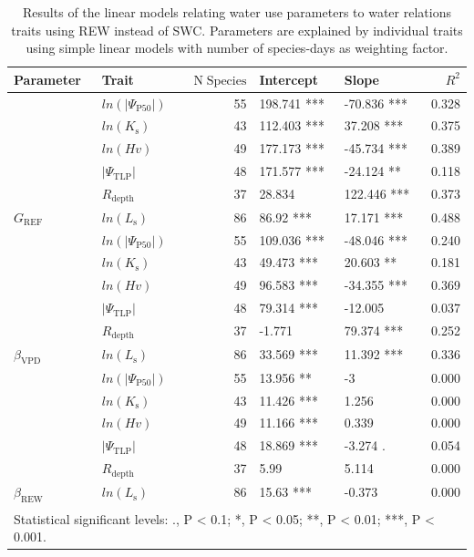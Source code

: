 \documentclass[11pt,twoside]{reedthesis}
\begin{document}
\newpage
\begin{table}[H]

\caption[Results of the linear models relating water use parameters to water relations traits using REW instead of SWC.]{\label{tab:tablaresultados}Results of the linear models relating water use parameters to water relations traits using REW instead of SWC. Parameters are explained by individual traits using simple linear models with number of species-days as weighting factor.}
\centering
\fontsize{12}{14}\selectfont
\begin{tabular}[t]{llrllr}
\toprule
Parameter & Trait & $\text{N}\;\text{Species}$ & Intercept & Slope & $R^2$\\
\midrule
 & $ln(\rvert\Psi_{\text{P50}}\rvert)$ & 55 & 198.741 *** & -70.836 *** & 0.328\\
\cmidrule{2-6}
 & $ln(K_{\text{s}})$ & 43 & 112.403 *** & 37.208 *** & 0.375\\
\cmidrule{2-6}
 & $ln(Hv)$ & 49 & 177.173 *** & -45.734 *** & 0.389\\
\cmidrule{2-6}
 & $\rvert\Psi_{\text{TLP}}\rvert$ & 48 & 171.577 *** & -24.124 ** & 0.118\\
\cmidrule{2-6}
 & $R_{\text{depth}}$ & 37 & 28.834 & 122.446 *** & 0.373\\
\cmidrule{2-6}
\multirow{-6}{*}{\raggedright\arraybackslash $G_{\text{REF}}$} & $ln(L_{\text{s}})$ & 86 & 86.92 *** & 17.171 *** & 0.488\\
\cmidrule{1-6}
 & $ln(\rvert\Psi_{\text{P50}}\rvert)$ & 55 & 109.036 *** & -48.046 *** & 0.240\\
\cmidrule{2-6}
 & $ln(K_{\text{s}})$ & 43 & 49.473 *** & 20.603 ** & 0.181\\
\cmidrule{2-6}
 & $ln(Hv)$ & 49 & 96.583 *** & -34.355 *** & 0.369\\
\cmidrule{2-6}
 & $\rvert\Psi_{\text{TLP}}\rvert$ & 48 & 79.314 *** & -12.005 & 0.037\\
\cmidrule{2-6}
 & $R_{\text{depth}}$ & 37 & -1.771 & 79.374 *** & 0.252\\
\cmidrule{2-6}
\multirow{-6}{*}{\raggedright\arraybackslash $\beta_{\text{VPD}}$} & $ln(L_{\text{s}})$ & 86 & 33.569 *** & 11.392 *** & 0.336\\
\cmidrule{1-6}
 & $ln(\rvert\Psi_{\text{P50}}\rvert)$ & 55 & 13.956 ** & -3 & 0.000\\
\cmidrule{2-6}
 & $ln(K_{\text{s}})$ & 43 & 11.426 *** & 1.256 & 0.000\\
\cmidrule{2-6}
 & $ln(Hv)$ & 49 & 11.166 *** & 0.339 & 0.000\\
\cmidrule{2-6}
 & $\rvert\Psi_{\text{TLP}}\rvert$ & 48 & 18.869 *** & -3.274 . & 0.054\\
\cmidrule{2-6}
 & $R_{\text{depth}}$ & 37 & 5.99 & 5.114 & 0.000\\
\cmidrule{2-6}
\multirow{-6}{*}{\raggedright\arraybackslash $\beta_{\text{REW}}$} & $ln(L_{\text{s}})$ & 86 & 15.63 *** & -0.373 & 0.000\\
\bottomrule
\multicolumn{6}{l}{\textsuperscript{} Statistical significant levels: ., P < 0.1; *, P < 0.05; **, P < 0.01; ***, P < 0.001.}\\
\end{tabular}
\end{table}
\end{document}
